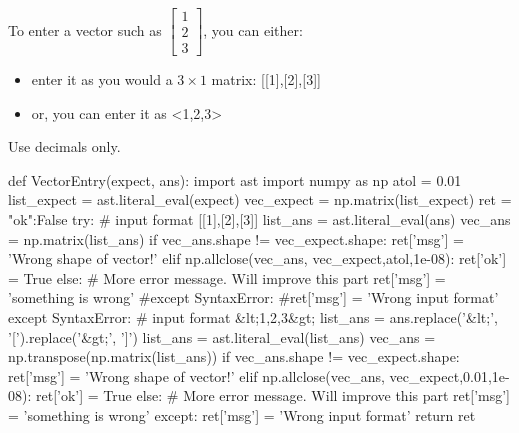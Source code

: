 To enter a vector such as $\left[\begin{array}{c} 1 \\ 2  \\ 3 \end{array} \right]$, you can either:
\begin{itemize}
\item
enter it as 
you would a $3\times 1$ matrix: [[1],[2],[3]]  
\item
or, you can enter it as <1,2,3>
\end{itemize}

Use decimals only.  

\begin{edXscript}
def VectorEntry(expect, ans):
	import ast
	import numpy as np 
  	atol = 0.01
	list_expect = ast.literal_eval(expect)
	vec_expect = np.matrix(list_expect)
  	ret = {"ok":False}
	try:
  		# input format [[1],[2],[3]]
		list_ans = ast.literal_eval(ans)
		vec_ans = np.matrix(list_ans)
  		if vec_ans.shape != vec_expect.shape:
  			ret['msg'] = 'Wrong shape of vector!'
  		elif np.allclose(vec_ans, vec_expect,atol,1e-08):
  			ret['ok'] = True
  		else:
  		# More error message. Will improve this part
  			ret['msg'] = 'something is wrong'   			
	#except SyntaxError:
		#ret['msg'] = 'Wrong input format'
	except SyntaxError:
  		# input format &lt;1,2,3&gt;
		list_ans = ans.replace('&lt;', '[').replace('&gt;', ']')
		list_ans = ast.literal_eval(list_ans)
		vec_ans = np.transpose(np.matrix(list_ans))
  		if vec_ans.shape != vec_expect.shape:
  			ret['msg'] = 'Wrong shape of vector!'
  		elif np.allclose(vec_ans, vec_expect,0.01,1e-08):
  			ret['ok'] = True
  		else:
    		# More error message. Will improve this part
  			ret['msg'] = 'something is wrong' 
  	except:
  		ret['msg'] = 'Wrong input format'
  	return ret 
\end{edXscript}
